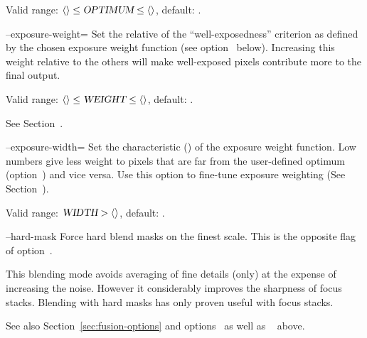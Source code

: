 \begin{codelist}
  Valid range: $\val{val:minimum-exposure-optimum} \leq
  \metavar{OPTIMUM} \leq \val{val:maximum-exposure-optimum}$, default:
  .


  \label{opt:exposure-weight}%
\item[--exposure-weight=\metavar{WEIGHT}]\itemend Set the relative
   of the ``well-exposedness'' criterion as defined by
  the chosen exposure weight function (see
  option~ below).  Increasing this
  weight relative to the others will make well-exposed pixels
  contribute more to the final output.

  Valid range: $\val{val:minimum-weight-exposure} \leq
  \metavar{WEIGHT} \leq \val{val:maximum-weight-exposure}$, default:
  .

  See Section~.


  \label{opt:exposure-width}%
\item[--exposure-width=\metavar{WIDTH}]\itemend Set the characteristic
   () of the
  exposure weight function.  Low numbers give less weight to pixels
  that are far from the user-defined optimum
  (option~) and vice versa.  Use this
  option to fine-tune exposure weighting (See
  Section~).

  Valid range: $\metavar{WIDTH} > \val{val:minimum-exposure-width}$,
  default: .


  \label{opt:hard-mask}%
\item[--hard-mask]\itemend Force hard blend masks on the finest scale.
  This is the opposite flag of option~.

  This blending mode avoids averaging of fine details (only) at the
  expense of increasing the noise.  However it considerably improves
  the sharpness of focus stacks.  Blending with hard masks has only
  proven useful with focus stacks.

  See also Section~\ref{sec:fusion-options} and
  options~ as well as
  ~ above.



\end{codelist}

